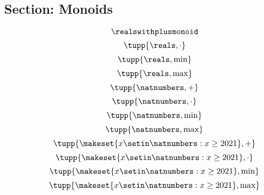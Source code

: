 {\begin{forslides}
    \subsection{Section: Monoids}

    \begin{equation}
        \label{eq:example-reals-plus}
        \realswithplusmonoid
    \end{equation}
    \begin{equation}
        \label{eq:example-reals-mult}
        \tupp{\reals, \cdot}
    \end{equation}
    \begin{equation}
        \label{eq:example-reals-min}
        \tupp{\reals, \min}
    \end{equation}
    \begin{equation}
        \label{eq:example-reals-max}
        \tupp{\reals, \max}
    \end{equation}
    \begin{equation}
        \label{eq:example-nats-plus}
        \tupp{\natnumbers, +}
    \end{equation}
    \begin{equation}
        \label{eq:example-nats-mult}
        \tupp{\natnumbers, \cdot}
    \end{equation}
    \begin{equation}
        \label{eq:example-nats-min}
        \tupp{\natnumbers, \min}
    \end{equation}
    \begin{equation}
        \label{eq:example-nats-max}
        \tupp{\natnumbers, \max}
    \end{equation}
    \begin{equation}
        \label{eq:example-nats21-plus}
        \tupp{ \makeset{x\setin\natnumbers: x \geq 2021 }, +}
    \end{equation}
    \begin{equation}
        \label{eq:example-nats21-mult}
        \tupp{ \makeset{x\setin\natnumbers: x \geq 2021 }, \cdot}
    \end{equation}
    \begin{equation}
        \label{eq:example-nats21-min}
        \tupp{ \makeset{x\setin\natnumbers: x \geq 2021 }, \min}
    \end{equation}
    \begin{equation}
        \label{eq:example-nats21-max}
        \tupp{ \makeset{x\setin\natnumbers: x \geq 2021 }, \max}

\end{equation}
\end{forslides}}
